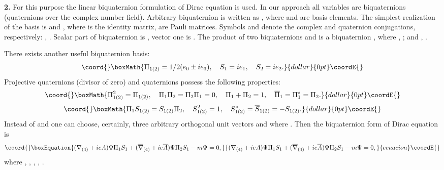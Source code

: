 \documentclass[12pt,a4paper]{article}
\begin{document}
{\bf 2.} For this purpose the linear biquaternion formulation of Dirac equation
\cite{Berezin} is used. In our approach all variables are biquaternions
(quaternions over the complex number field). Arbitrary biquaternion is
written as \coordHE{},
where \coordHE{} and \coordHE{} are basis elements.
The simplest realization of the basis is \coordHE{} and \coordHE{},
where \coordHE{} is the identity \coordHE{} matrix, \coordHE{} are Pauli matrices.
Symbols \coordHE{} and \coordHE{} denote the complex and quaternion
conjugations, respectively: \coordHE{}, \coordHE{}.
Scalar part of biquaternion is \coordHE{}, vector one is \coordHE{}.
The product of two biquaternions \coordHE{} and \coordHE{} is a
biquaternion \coordHE{}, where
\coordHE{},
\coordHE{};
\coordHE{} and
\coordHE{}, \coordHE{}.

There exists another useful biquaternion basis:
$$\coord{}\boxMath{\Pi_{1(2)}=1/2(e_0\pm ie_3), \quad S_1=ie_1, \quad S_2=ie_2.}{dollar}{0pt}\coordE{}$$
Projective quaternions \coordHE{} (divisor of zero) and
quaternions \coordHE{} possess the following properties:
$$\coord{}\boxMath{\Pi^{2}_{1(2)}=\Pi_{1(2)}, \quad \Pi_{1}\Pi_{2}=\Pi_{2}\Pi_{1}=0, \quad \Pi_{1}+\Pi_{2}=1,
\quad \overline{\Pi}_{1}=\Pi^{*}_{1}=\Pi_{2}.}{dollar}{0pt}\coordE{}$$  $$\coord{}\boxMath{\Pi_{1}S_{1(2)}=S_{1(2)}\Pi_{2}, \quad S_{1(2)}^{2}=1, \quad
S_{1(2)}^{*}=\overline{S}_{1(2)}=-S_{1(2)}.}{dollar}{0pt}\coordE{}$$
Instead of \coordHE{} and \coordHE{} one
can choose, certainly, three arbitrary orthogonal unit
vectors \coordHE{} and \coordHE{} where
\coordHE{}.
Then the biquaternion form of Dirac equation \cite{Berezin} is
\begin{equation}\coord{}\boxEquation{
(\nabla_{(4)}+ieA)\Psi \Pi_{1}S_1+(\overline{\nabla}_{(4)}+ie\overline{A})\Psi \Pi_{2}S_1-m\Psi
=0,
}{
(\nabla_{(4)}+ieA)\Psi \Pi_{1}S_1+(\overline{\nabla}_{(4)}+ie\overline{A})\Psi \Pi_{2}S_1-m\Psi
=0,
}{ecuacion}\coordE{}\end{equation}
where \coordHE{},
\coordHE{}, \coordHE{},
\coordHE{}, \coordHE{}.
\end{document}
